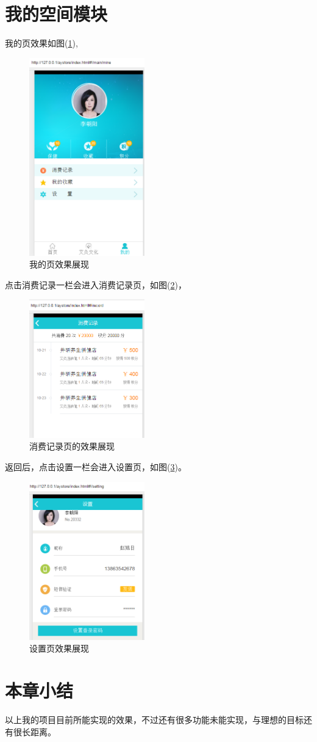     \clearpage
    \section{我的空间模块}
      \label{sec:我的空间模块}
        我的页效果如图(\ref{fig:mine_my}),
        \begin{figure}[htbp]
          \centering
          \includegraphics[width=5cm]{./img/mine_my.png}
          \caption{我的页效果展现}
          \label{fig:mine_my}
        \end{figure}
        点击消费记录一栏会进入消费记录页，如图(\ref{fig:record_my})，
        \begin{figure}[htbp]
          \centering
          \includegraphics[width=5cm]{./img/record_my.png}
          \caption{消费记录页的效果展现}
          \label{fig:record_my}
        \end{figure}
        返回后，点击设置一栏会进入设置页，如图(\ref{fig:setting_my})。
        \begin{figure}[htbp]
          \centering
          \includegraphics[width=5cm]{./img/setting_my.png}
          \caption{设置页效果展现}
          \label{fig:setting_my}
        \end{figure}

    \clearpage
    \section{本章小结}
      \label{sec:效果总结}
        以上我的项目目前所能实现的效果，不过还有很多功能未能实现，与理想的目标还有很长距离。

